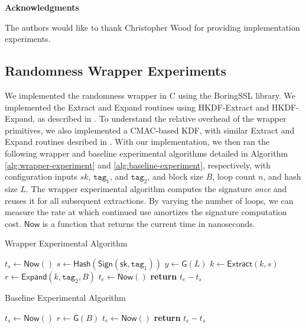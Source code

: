 \documentclass{article}
\begin{document}
{\noindent \textbf{Acknowledgments}

\vspace{10pt}

The authors would like to thank Christopher Wood for providing implementation experiments.  




\begin{appendix}
	
\section{Randomness Wrapper Experiments}\label{experiments}
	We implemented the randomness wrapper in C using the BoringSSL library.
We implemented the Extract and Expand routines using HKDF-Extract and HKDF-Expand, as described
in \cite{hkdfrfc}. To understand the relative
overhead of the wrapper primitives, we also implemented a CMAC-based KDF, with similar Extract and Expand routines desribed in \cite{ckdfirtf}. With our implementation, we then ran the following wrapper and baseline
experimental algorithms detailed in Algorithm \ref{alg:wrapper-experiment} and \ref{alg:baseline-experiment},
respectively, with configuration inputs $sk$, $\mathtt{tag}_1$, and $\mathtt{tag}_2$, and block
size $B$, loop count $n$, and hash size $L$. The wrapper experimental algorithm computes the signature
\emph{once} and reuses it for all subsequent extractions. By varying the number of loops, we can measure
the rate at which continued use amortizes the signature computation cost. $\mathsf{Now}$ is a function
that returns the current time in nanoseconds.

\begin{algorithm}
	\caption{Wrapper Experimental Algorithm}\label{alg:wrapper-experiment}
	\begin{algorithmic}[1]
		\State $t_s \gets \mathsf{Now()}$
		\State $s \gets \mathsf{Hash}(\mathsf{Sign}(\mathsf{sk}, \mathtt{tag}_1))$
		\State $y \gets \mathsf{G}(L)$
		\State $k \gets \mathsf{Extract}(k, s)$
		\State $r \gets \mathsf{Expand}(k, \mathtt{tag}_2, B)$
		\EndFor
		\State $t_e \gets \mathsf{Now()}$
		\State \textbf{return} $t_e - t_s$
	\end{algorithmic}
\end{algorithm}

\begin{algorithm}
	\caption{Baseline Experimental Algorithm}\label{alg:baseline-experiment}
	\begin{algorithmic}[1]
		\State $t_s \gets \mathsf{Now()}$
		\State $r \gets \mathsf{G}(B)$
		\EndFor
		\State $t_e \gets \mathsf{Now()}$
		\State \textbf{return} $t_e - t_s$
	\end{algorithmic}
\end{algorithm}


\end{appendix}}
\end{document}
